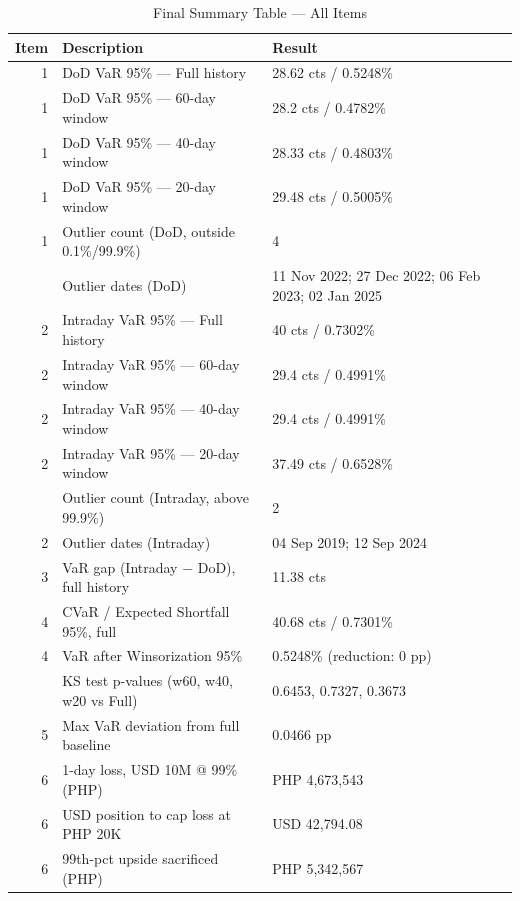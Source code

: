 \begin{table}

\caption{\label{tab:export_latex_tables}Final Summary Table — All Items}
\centering
\begin{tabular}[t]{rll}
\toprule
Item & Description & Result\\
\midrule
1 & DoD VaR 95\% — Full history & 28.62 cts / 0.5248\%\\
1 & DoD VaR 95\% — 60-day window & 28.2 cts / 0.4782\%\\
1 & DoD VaR 95\% — 40-day window & 28.33 cts / 0.4803\%\\
1 & DoD VaR 95\% — 20-day window & 29.48 cts / 0.5005\%\\
1 & Outlier count (DoD, outside 0.1\%/99.9\%) & 4\\
\addlinespace
1 & Outlier dates (DoD) & 11 Nov 2022; 27 Dec 2022; 06 Feb 2023; 02 Jan 2025\\
2 & Intraday VaR 95\% — Full history & 40 cts / 0.7302\%\\
2 & Intraday VaR 95\% — 60-day window & 29.4 cts / 0.4991\%\\
2 & Intraday VaR 95\% — 40-day window & 29.4 cts / 0.4991\%\\
2 & Intraday VaR 95\% — 20-day window & 37.49 cts / 0.6528\%\\
\addlinespace
2 & Outlier count (Intraday, above 99.9\%) & 2\\
2 & Outlier dates (Intraday) & 04 Sep 2019; 12 Sep 2024\\
3 & VaR gap (Intraday − DoD), full history & 11.38 cts\\
4 & CVaR / Expected Shortfall 95\%, full & 40.68 cts / 0.7301\%\\
4 & VaR after Winsorization 95\% & 0.5248\% (reduction: 0 pp)\\
\addlinespace
5 & KS test p-values (w60, w40, w20 vs Full) & 0.6453, 0.7327, 0.3673\\
5 & Max VaR deviation from full baseline & 0.0466 pp\\
6 & 1-day loss, USD 10M @ 99\% (PHP) & PHP 4,673,543\\
6 & USD position to cap loss at PHP 20K & USD 42,794.08\\
6 & 99th-pct upside sacrificed (PHP) & PHP 5,342,567\\
\bottomrule
\end{tabular}
\end{table}
